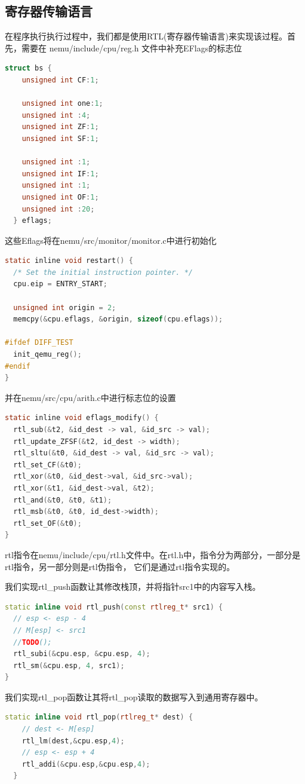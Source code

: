 \documentclass[UTF8,a4paper,10pt]{ctexart}
\begin{document}
\subsection{寄存器传输语言}
在程序执行执行过程中，我们都是使用RTL(寄存器传输语言)来实现该过程。首先，需要在 nemu/include/cpu/reg.h 文件中补充EFlags的标志位
\begin{lstlisting}[language=C]
  struct bs {
    unsigned int CF:1;

    unsigned int one:1;
    unsigned int :4;
    unsigned int ZF:1;
    unsigned int SF:1;

    unsigned int :1;
    unsigned int IF:1;
    unsigned int :1;
    unsigned int OF:1;
    unsigned int :20;
  } eflags;
\end{lstlisting}

这些Eflags将在nemu/src/monitor/monitor.c中进行初始化
\begin{lstlisting}[language = C]
static inline void restart() {
  /* Set the initial instruction pointer. */
  cpu.eip = ENTRY_START;

  unsigned int origin = 2;
  memcpy(&cpu.eflags, &origin, sizeof(cpu.eflags));

#ifdef DIFF_TEST
  init_qemu_reg();
#endif
}
\end{lstlisting}
并在nemu/src/cpu/arith.c中进行标志位的设置
\begin{lstlisting}[language = C]
static inline void eflags_modify() {
  rtl_sub(&t2, &id_dest -> val, &id_src -> val);
  rtl_update_ZFSF(&t2, id_dest -> width);
  rtl_sltu(&t0, &id_dest -> val, &id_src -> val);
  rtl_set_CF(&t0);
  rtl_xor(&t0, &id_dest->val, &id_src->val);
  rtl_xor(&t1, &id_dest->val, &t2);
  rtl_and(&t0, &t0, &t1);
  rtl_msb(&t0, &t0, id_dest->width);
  rtl_set_OF(&t0);
}
\end{lstlisting}

rtl指令在nemu/include/cpu/rtl.h文件中。在rtl.h中，指令分为两部分，一部分是rtl指令，另一部分则是rtl伪指令， 它们是通过rtl指令实现的。

我们实现rtl\_push函数让其修改栈顶，并将指针src1中的内容写入栈。
\begin{lstlisting}[language = C++]
static inline void rtl_push(const rtlreg_t* src1) {
  // esp <- esp - 4
  // M[esp] <- src1
  //TODO();
  rtl_subi(&cpu.esp, &cpu.esp, 4);
  rtl_sm(&cpu.esp, 4, src1);
}
\end{lstlisting}

我们实现rtl\_pop函数让其将rtl\_pop读取的数据写入到通用寄存器中。
\begin{lstlisting}[language = C++]
static inline void rtl_pop(rtlreg_t* dest) {
    // dest <- M[esp]
    rtl_lm(dest,&cpu.esp,4);
    // esp <- esp + 4
    rtl_addi(&cpu.esp,&cpu.esp,4);
  }
\end{lstlisting}
\end{document}
